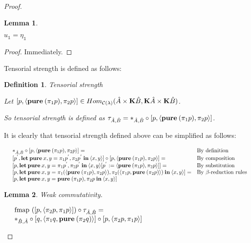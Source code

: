 \documentclass[a4paper]{article}
\newtheorem{lemma}{Lemma}
\newtheorem{defin}{Definition}
\begin{document}
\begin{proof}
\begin{lemma}
  $ $

  $u_{\mathds{1}} = \eta_{\mathds{1}}$

\end{lemma}

\begin{proof}

  Immediately.
\end{proof}

  Tensorial strength is defined as follows:

\begin{defin} Tensorial strength
  $ $

  Let $[p, \langle {\bf pure \:} (\pi_1 p), \pi_2 p \rangle] \in Hom_{\mathcal{C}(\lambda)}(\hat{A} \times {\bf K}\hat{B}, {\bf K}\hat{A} \times {\bf K}\hat{B})$.

  So tensorial strength is defined as $\tau_{\hat{A}, \hat{B}} = \ast_{\hat{A}, \hat{B}} \circ [p, \langle {\bf pure \:} (\pi_1 p), \pi_2 p \rangle]$.
\end{defin}

It is clearly that tensorial strength defined above can be simplified as follows:

$\begin{array}{lll}
&\ast_{\hat{A}, \hat{B}} \circ [p, \langle {\bf pure \:} (\pi_1 p), \pi_2 p \rangle] = & \text{By definition} \\
&[p^{'}, {\bf let \: pure \:} x, y = \pi_1 p^{'}, \pi_2 p^{'} {\: \bf in \:} \langle x, y \rangle] \circ [p, \langle {\bf pure \:} (\pi_1 p), \pi_2 p \rangle] = & \text{By composition} \\
&[p, {\bf let \: pure \:} x, y = \pi_1 p^{'}, \pi_2 p^{'} {\: \bf in \:} \langle x, y \rangle [p^{'} := \langle {\bf pure \:} (\pi_1 p), \pi_2 p \rangle]] = & \text{By substitution} \\
&[p, {\bf let \: pure \:} x, y = \pi_1 (\langle {\bf pure \:} (\pi_1 p), \pi_2 p \rangle), \pi_2 (\langle \pi_1 p, {\bf pure \:} (\pi_2 p) \rangle) {\: \bf in \:} \langle x, y \rangle] = & \text{By $\beta$-reduction rules} \\
&[p, {\bf let \: pure \:} x, y = {\bf pure \:} (\pi_1 p), \pi_2 p {\: \bf in \:} \langle x, y \rangle]&
\end{array}$



\begin{lemma} Weak commutativity.
  $ $

  $\begin{array}{lll}
  & \text{fmap } ([p, \langle \pi_2 p, \pi_1 p \rangle]) \circ \tau_{\hat{A},\hat{B}} = & \\
  & \ast_{\hat{B}, \hat{A}} \circ [q, \langle \pi_1 q, {\bf pure \:} (\pi_2 q) \rangle] \circ [p, \langle \pi_2 p, \pi_1 p \rangle]&
  \end{array}$
\end{lemma}


\end{proof}
\end{document}
